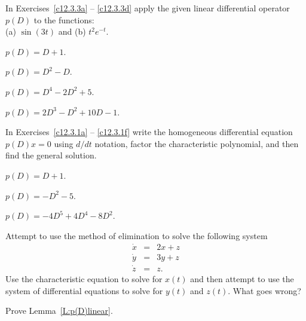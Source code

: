 \EXER

\TEXER

\noindent In Exercises~\ref{c12.3.3a} -- \ref{c12.3.3d} apply the given
linear differential operator $p(D)$ to the functions: \\
(a) $\sin(3t)$ and  (b) $t^2 e^{-t}$.
\begin{exercise} \label{c12.3.3a}
$p(D) = D+1$.
\end{exercise}
\begin{exercise} \label{c12.3.3b}
$p(D) = D^2-D$.
\end{exercise}
\begin{exercise} \label{c12.3.3c}
$p(D) = D^4-2D^2+5$.
\end{exercise}
\begin{exercise} \label{c12.3.3d}
$p(D) = 2D^3-D^2+10D-1$.
\end{exercise}


\noindent In Exercises~\ref{c12.3.1a} -- \ref{c12.3.1f} write the 
homogeneous differential equation $p(D)x=0$ using $d/dt$ notation,
factor the characteristic polynomial, and then find the general solution.
\begin{exercise}  \label{c12.3.1a}
$p(D) = D + 1$.
\end{exercise}
\begin{exercise}  \label{c12.3.1b}
$p(D) = -D^2 - 5$.
\end{exercise}

\begin{exercise}  \label{c12.3.1f}
$p(D) = -4D^5 +4D^4 -8D^2$.
\end{exercise}

\begin{exercise}  \label{c12.3.2}
Attempt to use the method of elimination to solve the following system
\[
\begin{array}{rcl}
\dot{x} & = & 2x + z\\
\dot{y} & = & 3y + z\\
\dot{z} & = & z.
\end{array}
\]
Use the characteristic equation  to solve for $x(t)$ and 
then attempt to use the system of differential equations to solve for $y(t)$ 
and $z(t)$.  What goes wrong?
\end{exercise} 

\begin{exercise}  \label{c12.3.lem}
Prove Lemma~\ref{L:p(D)linear}.
\end{exercise}

